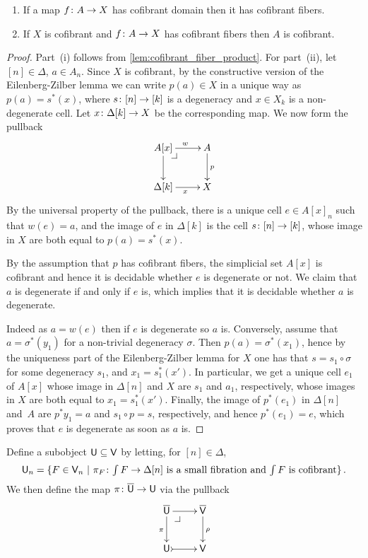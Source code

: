 \documentclass[reqno,10pt,a4paper,oneside,draft]{amsart}
\begin{document}
\begin{lemma} \label{lem:Cofib_fiber} \hfill 
\begin{enumerate}[$(i)$]
\item If a map $f \colon A \rightarrow X$ has cofibrant domain then it has cofibrant fibers.
\item If $X$ is cofibrant and $f \colon A \rightarrow X$ has cofibrant fibers then $A$ is cofibrant.
\end{enumerate}
\end{lemma} 

\begin{proof} Part~(i) follows from \cref{lem:cofibrant_fiber_product}. For part~(ii), let $[n] \in \Delta$, $a \in A_n$. Since $X$ is cofibrant, by the constructive version of the Eilenberg-Zilber lemma we can write $p(a) \in X$ in a unique way as $p(a) =s^*(x)$, where $s \colon [n] \to [k]$ is a degeneracy and 
$x \in X_k$ is a non-degenerate cell. Let $x \colon \Delta[k] \rightarrow X$ be the corresponding map. We now form the pullback
\[
\xymatrix{
A[x] \ar[r]^w \ar[d] \drpullback & A  \ar[d]^{p}  \\
\Delta[k] \ar[r]_{x} & X }
\]
By the universal property of the pullback, there is a unique cell $e \in A[x]_n$ such that $w(e)=a$, and the image of $e$ in $\Delta[k]$ is the cell $s \colon [n] \to [k]$, whose image in $X$ are both equal to $p(a)=s^*(x)$.

By the assumption that $p$ has cofibrant fibers, the simplicial set $A[x]$ is cofibrant and hence it is decidable whether $e$ is degenerate or not. We claim that $a$ is degenerate if and only if $e$ is, which implies that it is decidable whether $a$ is degenerate.

 Indeed as $a = w(e)$ then if $e$ is degenerate so $a$ is. Conversely, assume that $a=\sigma^*(y_1)$ for a non-trivial degeneracy $\sigma$. Then $p(a)=\sigma^*(x_1)$, hence by the uniqueness part of the Eilenberg-Zilber lemma for $X$ one has that $s=s_1 \circ \sigma$ for some degeneracy $s_1$, and $x_1 = s_1^*(x')$. In particular, we get a unique cell $e_1$ of $A[x]$ whose image in $\Delta[n]$ and $X$ are  $s_1$ and $a_1$, respectively, whose images in $X$ are both equal to $x_1=s_1^*(x')$. Finally, the image of $p^*(e_1)$ in $\Delta[n]$ and~$A$ are  $p^* y_1 =a$ and $s_1 \circ p =s$, respectively, and hence $p^*(e_1) =e$, which proves that $e$ is degenerate as soon as $a$ is.
\end{proof} 


Define a subobject $\mathsf{U} \subseteq \mathsf{V}$ by letting, for $[n] \in \Delta$, 
\[
\mathsf{U}_n = \{ F \in \mathsf{V}_n \ | \ \pi_F \colon \textstyle{\int F} \to \Delta[n] \text{ is a small fibration and 
$ \textstyle{\int F}$ is cofibrant} \} \, .
\]
We then define the map $\pi \colon \overline{\mathsf{U}} \to \mathsf{U}$ via the pullback 
\begin{equation}
\label{equ:def-of-pi}
\begin{gathered}
\xymatrix{
\UU \ar[r] \ar[d]_\pi \drpullback  & \VV \ar[d]^\rho \\
\U \ar@{>->}[r] & \V }
\end{gathered}
\end{equation}
\end{document}
